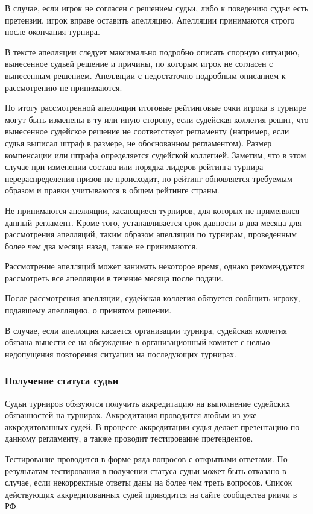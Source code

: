 В случае, если игрок не согласен с решением судьи, либо к поведению судьи есть претензии, игрок вправе оставить апелляцию. Апелляции принимаются строго после окончания турнира.

В тексте апелляции следует максимально подробно описать спорную ситуацию, вынесенное судьей решение и причины, по которым игрок не согласен с вынесенным решением. Апелляции с недостаточно подробным описанием к рассмотрению не принимаются.

По итогу рассмотренной апелляции итоговые рейтинговые очки игрока в турнире могут быть изменены в ту или иную сторону, если судейская коллегия решит, что вынесенное судейское решение не соответствует регламенту (например, если судья выписал штраф в размере, не обоснованном регламентом). Размер компенсации или штрафа определяется судейской коллегией. Заметим, что в этом случае при изменении состава или порядка лидеров рейтинга турнира перераспределения призов не происходит, но рейтинг обновляется требуемым образом и правки учитываются в общем рейтинге страны.

Не принимаются апелляции, касающиеся турниров, для которых не применялся данный регламент. Кроме того, устанавливается срок давности в два месяца для рассмотрения апелляций, таким образом апелляции по турнирам, проведенным более чем два месяца назад, также не принимаются.

Рассмотрение апелляций может занимать некоторое время, однако рекомендуется рассмотреть все апелляции в течение месяца после подачи. 

После рассмотрения апелляции, судейская коллегия обязуется сообщить игроку, подавшему апелляцию, о принятом решении.

В случае, если апелляция касается организации турнира, судейская коллегия обязана вынести ее на обсуждение в организационный комитет с целью недопущения повторения ситуации на последующих турнирах.

\subsubsection{Получение статуса судьи}

Судьи турниров обязуются получить аккредитацию на выполнение судейских обязанностей на турнирах. Аккредитация проводится любым из уже аккредитованных судей. В процессе аккредитации судья делает презентацию по данному регламенту, а также проводит тестирование претендентов.

Тестирование проводится в форме ряда вопросов с открытыми ответами. По результатам тестирования в получении статуса судьи может быть отказано в случае, если некорректные ответы даны на более чем треть вопросов. Список действующих аккредитованных судей приводится на сайте сообщества риичи в РФ.

